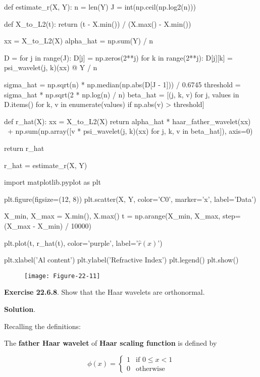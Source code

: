 \begin{python}
def estimate_r(X, Y):
    n = len(Y)
    J = int(np.ceil(np.log2(n)))

    def X_to_L2(t):
        return (t - X.min()) / (X.max() - X.min())

    xx = X_to_L2(X)
    alpha_hat = np.sum(Y) / n

    D = {}
    for j in range(J):
        D[j] = np.zeros(2**j)
        for k in range(2**j):
            D[j][k] = psi_wavelet(j, k)(xx) @ Y / n

    sigma_hat = np.sqrt(n) * np.median(np.abs(D[J - 1])) / 0.6745
    threshold = sigma_hat * np.sqrt(2 * np.log(n) / n)
    beta_hat = [(j, k, v) for j, values in D.items() for k, v in enumerate(values) if np.abs(v) > threshold]

    def r_hat(X):
        xx = X_to_L2(X)
        return alpha_hat * haar_father_wavelet(xx) \
            + np.sum(np.array([v * psi_wavelet(j, k)(xx) for j, k, v in beta_hat]), axis=0)
    
    return r_hat
\end{python}

\begin{python}
r_hat = estimate_r(X, Y)
\end{python}

\begin{python}
import matplotlib.pyplot as plt

plt.figure(figsize=(12, 8))
plt.scatter(X, Y, color='C0', marker='x', label='Data')

X_min, X_max = X.min(), X.max()
t = np.arange(X_min, X_max, step=(X_max - X_min) / 10000)

plt.plot(t, r_hat(t), color='purple', label='$\hat{r}(x)$')

plt.xlabel('Al content')
plt.ylabel('Refractive Index')
plt.legend()
plt.show()
\end{python}

\begin{figure}[H]
\centering
\texttt{[image: Figure-22-11]}
\end{figure}

\textbf{Exercise 22.6.8}. Show that the Haar wavelets are orthonormal.

\textbf{Solution}.

Recalling the definitions:

The \textbf{father Haar wavelet} of \textbf{Haar scaling function} is
defined by

\[ \phi(x) = \begin{cases}
1 & \text{if } 0 \leq x < 1 \\
0 & \text{otherwise}
\end{cases} \]

